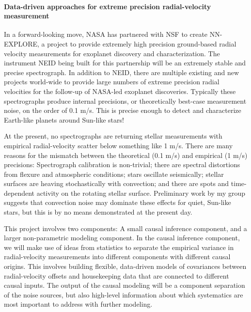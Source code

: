 \documentclass[12pt, fullpage, letterpaper]{article}
\begin{document}
\paragraph{Data-driven approaches for extreme precision radial-velocity measurement}

In a forward-looking move, NASA has partnered with NSF to create
NN-EXPLORE, a project to provide extremely high precision ground-based
radial velocity measurements for exoplanet discovery and
characterization. The instrument NEID being built for this partnership
will be an extremely stable and precise spectrograph. In addition to
NEID, there are multiple existing and new projects world-wide to
provide large numbers of extreme precision radial velocities for the
follow-up of NASA-led exoplanet discoveries. Typically these
spectrographs produce internal precisions, or theoretically best-case
measurement noise, on the order of 0.1 m/s. This is precise enough to
detect and characterize Earth-like planets around Sun-like stars!

At the present, no spectrographs are returning stellar measurements
with empirical radial-velocity scatter below something like 1
m/s. There are many reasons for the mismatch between the theoretical
(0.1 m/s) and empirical (1 m/s) precisions: Spectrograph calibration
is non-trivial; there are spectral distortions from flexure and
atmospheric conditions; stars oscillate seismically; stellar surfaces
are heaving stochastically with convection; and there are spots and
time-dependent activity on the rotating stellar surface. Preliminary
work by my group suggests that convection noise may dominate these
effects for quiet, Sun-like stars, but this is by no means
demonstrated at the present day.

This project involves two components: A small causal inference
component, and a larger non-parametric modeling component. In the
causal inference component, we will make use of ideas from statistics
to separate the empirical variance in radial-velocity measurements
into different components with different causal origins. This involves
building flexible, data-driven models of covariances between
radial-velocity offsets and housekeeping data that are connected to
different causal inputs. The output of the causal modeling will be a
component separation of the noise sources, but also high-level
information about which systematics are most important to address with
further modeling.
\end{document}
